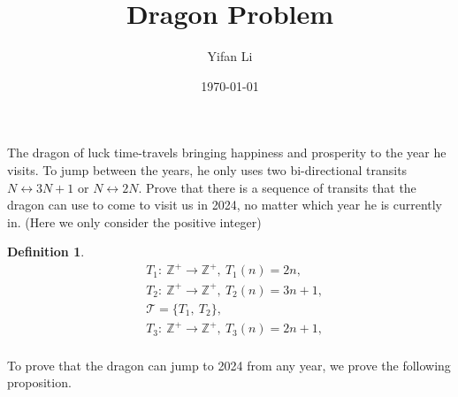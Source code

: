 \documentclass{article}
\title{\vspace{-2cm} Dragon Problem}
\author{Yifan Li}
\date{\today}
\newtheorem{definition}{\bf Definition}
\begin{document}
\maketitle
The dragon of luck time-travels bringing happiness and prosperity to the year he visits. To jump between the years, he only uses two bi-directional transits $N \leftrightarrow 3N +1$ or $N \leftrightarrow 2N$. Prove that there is a sequence of transits that the dragon can use to come to visit us in 2024, no matter which year he is currently in. (Here we only consider the positive integer)

\begin{definition}
    \begin{equation*}
        \begin{split}
            &T_1:\ \mathbb{Z}^+\rightarrow\mathbb{Z}^+,\ T_1(n)=2n,\\
            &T_2:\ \mathbb{Z}^+\rightarrow\mathbb{Z}^+,\ T_2(n)=3n+1,\\
            &\mathcal{T}=\{T_1,\ T_2\},\\
            &T_3:\ \mathbb{Z}^+\rightarrow\mathbb{Z}^+,\ T_3(n)=2n+1,\\
        \end{split}
    \end{equation*}
\end{definition}

To prove that the dragon can jump to 2024 from any year, we prove the following proposition.
\end{document}
